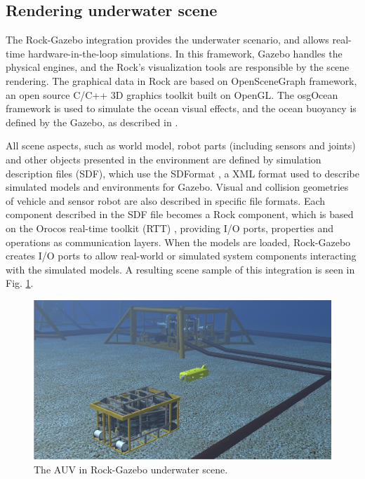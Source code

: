 \documentclass[final,5p,times]{elsarticle}
\begin{document}

\subsection{Rendering underwater scene}
\label{dev:uwscene}

The Rock-Gazebo integration \cite{watanabe2015} provides the underwater
scenario, and allows real-time hardware-in-the-loop simulations. In this
framework, Gazebo handles the physical engines, and the Rock's visualization
tools are responsible by the scene rendering. The graphical data in Rock are
based on OpenSceneGraph framework, an open source C/C++ 3D graphics toolkit
built on OpenGL. The osgOcean framework is used to simulate the ocean visual
effects, and the ocean buoyancy is defined by the Gazebo, as described
in \cite{watanabe2015}.

All scene aspects, such as world model, robot parts (including sensors and
joints) and other objects presented in the environment are defined by simulation
description files (SDF), which use the SDFormat \cite{sdformat2017}, a XML
format used to describe simulated models and environments for Gazebo. Visual
and collision geometries of vehicle and sensor robot are also described in
specific file formats. Each component described in the SDF file becomes a
Rock component, which is based on the Orocos real-time toolkit (RTT)
\cite{soetens2005}, providing I/O ports, properties and operations as
communication layers. When the models are loaded, Rock-Gazebo creates I/O
ports to allow real-world or simulated system components interacting with the
simulated models. A resulting scene sample of this integration is seen
in Fig. \ref{fig:uwscene}.

\begin{figure}[t]
    \includegraphics[width=\columnwidth]{figs/uwscene}
    \centering
    \captionsetup{justification=centering}
    \caption{The AUV in Rock-Gazebo underwater scene.}
    \label{fig:uwscene}
\end{figure}
\end{document}
